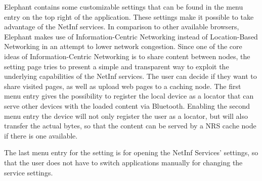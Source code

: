 Elephant contains some customizable settings that can be found in the menu entry on the top right of the application.
These settings make it possible to take advantage of the NetInf services. In comparison to other
available browsers, Elephant makes use of Information-Centric Networking instead of Location-Based Networking
in an attempt to lower network congestion.
Since one of the core ideas of Information-Centric Networking is to share content between nodes, the setting page
tries to present a simple and transparent way to exploit the underlying capabilities of the NetInf services.
The user can decide if they want to share visited pages, as well as upload web pages to a caching node.
The first menu entry gives the possibility to register the local device as a locator that can serve other devices
with the loaded content via Bluetooth.
Enabling the second menu entry the device will not only register the user as a locator, but will also transfer the actual bytes,
so that the content can be served by a NRS cache node if there is one available.

The last menu entry for the setting is for opening the NetInf Services' settings, so that the user does not have to switch applications
manually for changing the service settings.
\newpage


